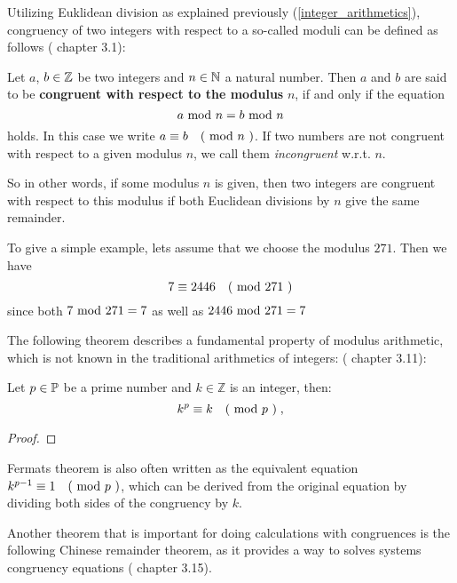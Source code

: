 Utilizing Euklidean division as explained previously (\ref{integer_arithmetics}), congruency of two integers with respect to a so-called moduli can be defined as follows
(\cite{JB} chapter 3.1):
\begin{definition}[congruency] Let $ a $, $ b \in \mathbb{Z} $ be two integers and $ n \in \mathbb{N} $ a natural number.
Then $ a $ and $ b $ are said to be \textbf{congruent with respect to the modulus} $ n $, if and only if the equation
\begin{equation}
a \text{ mod } n = b \text{ mod } n
\end{equation}
holds. In this case we write
$ a \equiv b \quad \text{( mod } n \text{ )} $. If two numbers are not congruent with respect to a given modulus $n$, we call them \textit{incongruent} w.r.t. $n$.
\end{definition}
So in other words, if some modulus $n$ is given, then two integers are congruent with respect to this modulus if both Euclidean divisions by $n$ give the same remainder.   
\begin{example}To give a simple example, lets assume that we choose the modulus $271$. Then we have
$$ 7 \equiv 2446 \quad \text{( mod } 271 \text{ )} $$
since both $7 \text{ mod } 271 = 7$ as well as $2446 \text{ mod } 271=7$
\end{example}
The following theorem describes a fundamental property of modulus arithmetic, which is not known in the traditional arithmetics of integers: (\cite{JB} chapter 3.11):
\begin{theorem}  Let $ p \in \mathbb{P} $ be a prime number and $ k \in \mathbb{Z} $ is an integer, then:
\begin{equation}
k ^ p \equiv k \quad \text{( mod } p \text{ )} \;,
\end{equation}
\end{theorem}
\begin{proof} 
\end{proof}
\begin{remark}
Fermats theorem is also often written as the equivalent equation $k ^{p-1} \equiv 1 \quad \text{( mod } p \text{ )}$, which can be derived from the original equation by dividing both sides of the congruency by $k$. 
\end{remark}
Another theorem that is important for doing calculations with congruences is the following Chinese remainder theorem, as it provides a way to solves systems congruency equations (\cite{JB} chapter 3.15).

